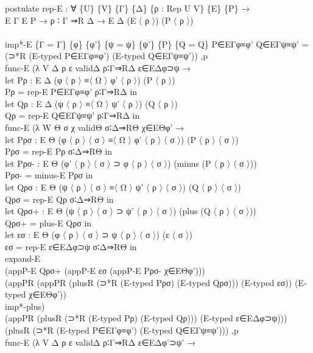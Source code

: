 {\begin{code}
{\>postulate rep-E : ∀ \{U\} \{V\} \{Γ\} \{Δ\} \{ρ : Rep U V\} \{E\} \{P\} →\<\\
\>                 E Γ E P → ρ ∶ Γ ⇒R Δ → E Δ (E 〈 ρ 〉) (P 〈 ρ 〉)\<\\
\>\<\\
\>imp*-E \{Γ = Γ\} \{φ\} \{φ'\} \{ψ = ψ\} \{ψ'\} \{P\} \{Q = Q\} P∈EΓφ≡φ' Q∈EΓψ≡ψ' = (⊃*R (E-typed P∈EΓφ≡φ') (E-typed Q∈EΓψ≡ψ')) ,p \<\\
\>  func-E (λ V Δ ρ ε validΔ ρ∶Γ⇒RΔ ε∈EΔφ⊃ψ →\<\\
\>    let Pρ : E Δ (φ 〈 ρ 〉 ≡〈 Ω 〉 φ' 〈 ρ 〉) (P 〈 ρ 〉)\<\\
\>        Pρ = rep-E P∈EΓφ≡φ' ρ∶Γ⇒RΔ in\<\\
\>    let Qρ : E Δ (ψ 〈 ρ 〉 ≡〈 Ω 〉 ψ' 〈 ρ 〉) (Q 〈 ρ 〉)\<\\
\>        Qρ = rep-E Q∈EΓψ≡ψ' ρ∶Γ⇒RΔ in\<\\
\>    func-E (λ W Θ σ χ validΘ σ∶Δ⇒RΘ χ∈EΘφ' → \<\\
\>    let Pρσ : E Θ (φ 〈 ρ 〉 〈 σ 〉 ≡〈 Ω 〉 φ' 〈 ρ 〉 〈 σ 〉) (P 〈 ρ 〉 〈 σ 〉)\<\\
\>        Pρσ = rep-E Pρ σ∶Δ⇒RΘ in\<\\
\>    let Pρσ- : E Θ (φ' 〈 ρ 〉 〈 σ 〉 ⊃ φ 〈 ρ 〉 〈 σ 〉) (minus (P 〈 ρ 〉 〈 σ 〉))\<\\
\>        Pρσ- = minus-E Pρσ in\<\\
\>    let Qρσ : E Θ (ψ 〈 ρ 〉 〈 σ 〉 ≡〈 Ω 〉 ψ' 〈 ρ 〉 〈 σ 〉) (Q 〈 ρ 〉 〈 σ 〉)\<\\
\>        Qρσ = rep-E Qρ σ∶Δ⇒RΘ in\<\\
\>    let Qρσ+ : E Θ (ψ 〈 ρ 〉 〈 σ 〉 ⊃ ψ' 〈 ρ 〉 〈 σ 〉) (plus (Q 〈 ρ 〉 〈 σ 〉))\<\\
\>        Qρσ+ = plus-E Qρσ in\<\\
\>    let εσ : E Θ (φ 〈 ρ 〉 〈 σ 〉 ⊃ ψ 〈 ρ 〉 〈 σ 〉) (ε 〈 σ 〉)\<\\
\>        εσ = rep-E ε∈EΔφ⊃ψ σ∶Δ⇒RΘ in\<\\
\>    expand-E \<\\
\>    (appP-E Qρσ+ (appP-E εσ (appP-E Pρσ- χ∈EΘφ')))\<\\
\>    (appPR (appPR (plusR (⊃*R (E-typed Pρσ) (E-typed Qρσ))) (E-typed εσ)) (E-typed χ∈EΘφ')) \<\\
\>    imp*-plus) \<\\
\>    (appPR (plusR (⊃*R (E-typed Pρ) (E-typed Qρ))) (E-typed ε∈EΔφ⊃ψ))) \<\\
\>  (plusR (⊃*R (E-typed P∈EΓφ≡φ') (E-typed Q∈EΓψ≡ψ'))) ,p \<\\
\>  func-E (λ V Δ ρ ε validΔ ρ∶Γ⇒RΔ ε∈EΔφ'⊃ψ' →\<\\
}
\end{code}}
